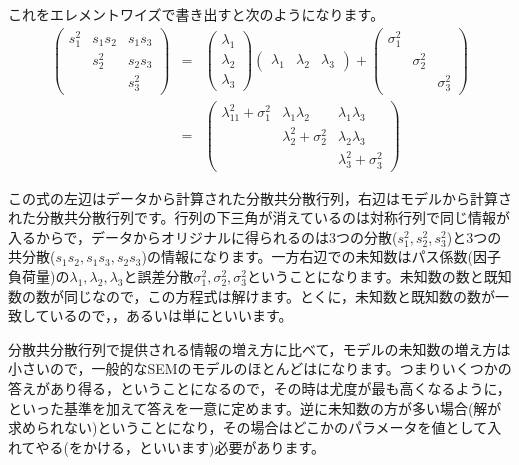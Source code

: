 \documentclass{ltjsbook}
\begin{document}
これをエレメントワイズで書き出すと次のようになります。
\begin{eqnarray*}
	\begin{pmatrix} s_1^2 & s_1s_2 & s_1s_3 \\
                      & s_2^2  & s_2s_3 \\
                      &        & s_3^2\end{pmatrix}
	&=& \begin{pmatrix} \lambda_1\\ \lambda_2 \\ \lambda_3 \end{pmatrix}\begin{pmatrix} \lambda_1 & \lambda_2 & \lambda_3 \end{pmatrix} + \begin{pmatrix} \sigma_1^2 & & \\ & \sigma_2^2 & \\ & & \sigma_3^2 \end{pmatrix} \\
	&=& \begin{pmatrix} \lambda_11^2 + \sigma_1^2 & \lambda_1\lambda_2       & \lambda_1 \lambda_3      \\
                                          & \lambda_2^2 + \sigma_2^2 & \lambda_2 \lambda_3      \\
                                          &                          & \lambda_3^2 + \sigma_3^2\end{pmatrix}
\end{eqnarray*}

この式の左辺はデータから計算された分散共分散行列，右辺はモデルから計算された分散共分散行列です。行列の下三角が消えているのは対称行列で同じ情報が入るからで，データからオリジナルに得られるのは3つの分散($s_1^2,s_2^2,s_3^2$)と3つの共分散($s_1s_2,s_1s_3,s_2s_3$)の情報になります。一方右辺での未知数はパス係数(因子負荷量)の$\lambda_1,\lambda_2,\lambda_3$と誤差分散$\sigma_1^2,\sigma_2^2,\sigma_3^2$ということになります。未知数の数と既知数の数が同じなので，この方程式は解けます。とくに，未知数と既知数の数が一致しているので，，あるいは単にといいます。

分散共分散行列で提供される情報の増え方に比べて，モデルの未知数の増え方は小さいので，一般的なSEMのモデルのほとんどはになります。つまりいくつかの答えがあり得る，ということになるので，その時は尤度が最も高くなるように，といった基準を加えて答えを一意に定めます。逆に未知数の方が多い場合(解が求められない)ということになり，その場合はどこかのパラメータを値として入れてやる(をかける，といいます)必要があります。
\end{document}
